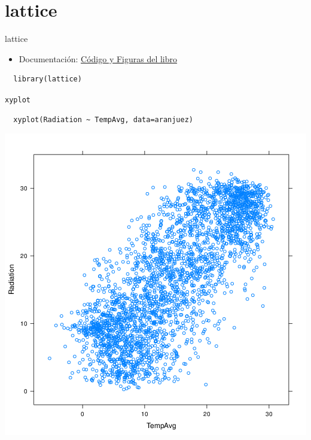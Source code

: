 \documentclass[xcolor={usenames,svgnames,dvipsnames}]{beamer}
\begin{document}
\section{lattice}
\label{sec-3}

\begin{frame}[fragile,label=sec-3-1]{lattice}
 \begin{itemize}
\item Documentación: \href{http://lmdvr.r-forge.r-project.org/figures/figures.html}{Código y Figuras del libro}
\end{itemize}

\lstset{language=R,label= ,caption= ,numbers=none}
\begin{lstlisting}
  library(lattice)
\end{lstlisting}
\end{frame}

\begin{frame}[fragile,label=sec-3-2]{\texttt{xyplot}}
 \lstset{language=R,label= ,caption= ,numbers=none}
\begin{lstlisting}
  xyplot(Radiation ~ TempAvg, data=aranjuez)
\end{lstlisting}
\end{frame}

\begin{frame}[label=sec-3-3]{}
\includegraphics[width=.9\linewidth]{figs/xyplot.png}
\end{frame}
\end{document}
